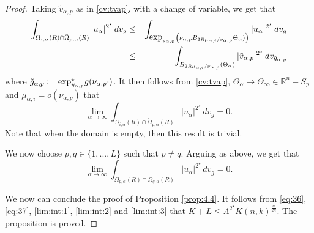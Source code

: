 \documentclass[reqno]{amsart}
\def \rn {\mathbb{R}^n}
\def \crit {2^\star}
\def \ua {u_\alpha}
\def \mai {\mu_{\alpha,i}}
\def \tvap {\tilde{v}_{\alpha,p}}
\def \nap {\nu_{\alpha,p}}
\def \yap {y_{\alpha,p}}
\begin{document}
\begin{proof}
\smallskip\noindent Taking $\tvap$ as in \eqref{cv:tvap}, with a change of variable, we get that
\begin{eqnarray*}\int_{\Omega_{i,\alpha}(R)\cap \tilde{\Omega}_{p,\alpha}(R)}|\ua|^{\crit}\, dv_g&\leq& \int_{\hbox{exp}_{\yap}\left(\nap B_{2R\mai/\nap}\Theta_\alpha)\right)}|\ua|^{\crit}\, dv_g\\
&\leq& \int_{B_{2R\mai/\nap}(\Theta_\alpha)}|\tvap|^{\crit}\, dv_{\tilde{g}_{\alpha,p}}
\end{eqnarray*}
where $\tilde{g}_{\alpha,p}:=\hbox{exp}_{\yap}^{\star}g(\nap\cdot)$. It then follows from \eqref{cv:tvap}, $\Theta_\alpha\to\Theta_\infty\in\rn-S_p$ and  $\mai=o(\nap)$ that 
\begin{equation}\label{lim:int:2}
\lim_{\alpha\to \infty}\int_{\Omega_{i,\alpha}(R)\cap \tilde{\Omega}_{p,\alpha}(R)}|\ua|^{\crit}\, dv_g=0.
\end{equation}
Note that when the domain is empty, then this result is trivial.

\medskip\noindent We now choose $p,q\in \{1,...,L\}$ such that $p\neq q$. Arguing as above, we get that
\begin{equation}\label{lim:int:3}
\lim_{\alpha\to \infty}\int_{\tilde{\Omega}_{p,\alpha}(R)\cap \tilde{\Omega}_{q,\alpha}(R)}|\ua|^{\crit}\, dv_g=0.
\end{equation}


\smallskip\noindent We now can conclude the proof of Proposition \ref{prop:4.4}. It follows from \eqref{eq:36}, \eqref{eq:37}, \eqref{lim:int:1}, \eqref{lim:int:2} and \eqref{lim:int:3} that  $K+L\leq \Lambda^{\crit} K(n,k)^{\frac{n}{2k}}$. The proposition is proved.\end{proof}
\end{document}
